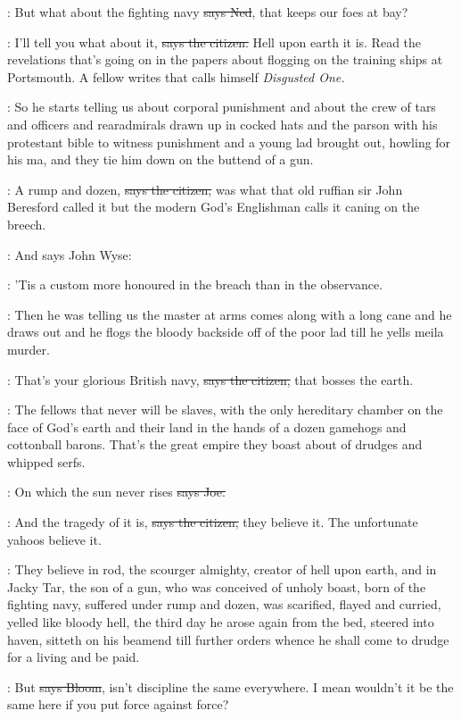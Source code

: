 \lambert:
But what about the fighting navy
\sout{says Ned},
that keeps our foes at bay?

\citizen:
I'll tell you what about it,
\sout{says the citizen.}
Hell upon earth it is.
Read the revelations that's going on in the papers
about flogging on the training ships at Portsmouth.
A fellow writes that calls himself \emph{Disgusted One.}

\Nq:
So he starts telling us about corporal punishment and about the crew
of tars and officers and rearadmirals drawn up in cocked hats and the
parson with his protestant bible to witness punishment and a young lad brought out,
howling for his ma,
and they tie him down on the buttend of a gun.

\citizen:
A rump and dozen,
\sout{says the citizen,}
was what that old ruffian sir John Beresford called it
but the modern God's Englishman
calls it caning on the breech.%

\Nq:
And says John Wyse:

\johnwyse:
'Tis a custom more honoured in the breach
than in the observance.

\Nq:
Then he was telling us the master at arms
comes along with a long cane
and he draws out
and he flogs the bloody backside off of the poor lad
till he yells meila murder.

\citizen:
That's your glorious British navy,
\sout{says the citizen,}
that bosses the earth.

\citizen:
The fellows that never will be slaves,
with the only hereditary chamber on the face of God's earth
and their land
in the hands of a dozen gamehogs
and cottonball barons.
That's the great empire they boast about
of drudges
and whipped serfs.%

\joe:
On which the sun never rises
\sout{says Joe.}

\citizen:
And the tragedy of it is,
\sout{says the citizen,}
they believe it.
The unfortunate yahoos believe it.

:
They believe in rod,
the scourger almighty,
creator of hell upon earth,
and in Jacky Tar,
the son of a gun,
who was conceived of unholy boast,
born of the fighting navy,
suffered under rump and dozen,
was scarified,
flayed and curried,
yelled like bloody hell,
the third day he arose again
from the bed,
steered into haven,
sitteth on his beamend
till further orders
whence he shall come to drudge
for a living
and be paid.

\Bloom:
But
\sout{says Bloom},
isn't discipline the same everywhere.
I mean
wouldn't it be the same here
if you put force against force?

